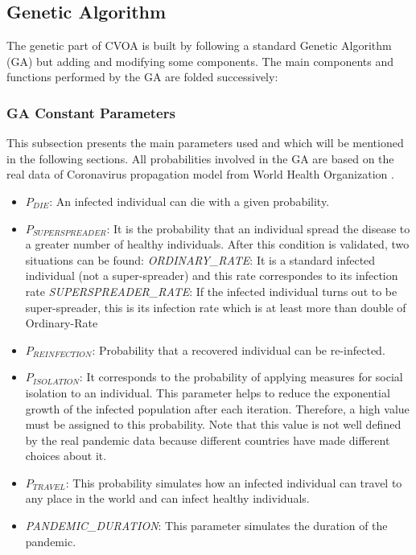 \documentclass[letterpaper]{article}%
\begin{document}
\subsection{Genetic Algorithm}
	The genetic part of CVOA is built by following a standard Genetic Algorithm (GA) but adding and modifying some components.
The main components and functions performed by the GA are folded successively:

\subsubsection{GA Constant Parameters}
This subsection presents the main parameters used and which will be mentioned in the following sections.
All probabilities involved in the GA are based on the real data of Coronavirus propagation model from World Health Organization \cite{who}.
\begin{itemize}
\item $P_{DIE}$: An infected individual can die with a given probability.
\item $P_{SUPERSPREADER}$: It is the probability that an individual spread the disease to a greater number of healthy individuals. After this condition is validated, two situations can be found: %
\subitem \textit{ORDINARY\_RATE}: It is a standard infected individual (not a super-spreader) and this rate correspondes to its infection rate
\subitem \textit{SUPERSPREADER\_RATE}: If the infected individual turns out to be super-spreader, this is its infection rate which is at least more than double of Ordinary-Rate
\item $P_{REINFECTION}$: Probability that a recovered individual can be re-infected.
\item $P_{ISOLATION}$: It corresponds to the probability of applying measures for social isolation to an individual. This parameter helps to reduce the exponential growth of the infected population after each iteration. Therefore, a high value must be assigned to this probability. Note that this value is not well defined by the real pandemic data because different countries have made different choices about it. 
\item $P_{TRAVEL}$: This probability simulates how an infected individual can travel to any place in the world and can infect healthy individuals.
\item \textit{PANDEMIC\_DURATION}: This parameter simulates the duration of the pandemic.
\end{itemize}
\end{document}

